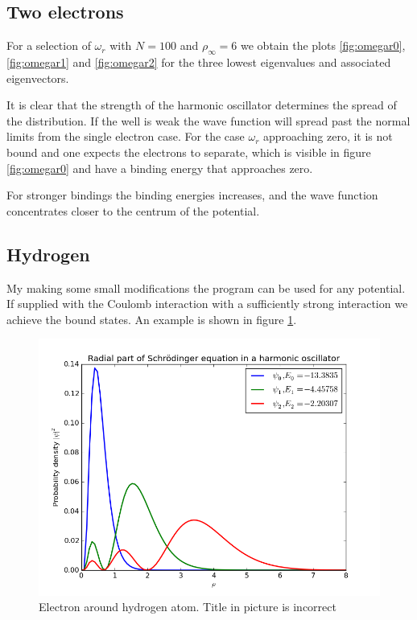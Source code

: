\documentclass[11pt,a4paper,english,final]{article}
\numberwithin{equation}{section}
\newcommand{\figurewidth}{.85\textwidth}
\begin{document}
\subsection{Two electrons}

For a selection of $\omega_r$ with $N = 100$ and $\rho_\infty = 6$ we
obtain the plots \ref{fig:omegar0}, \ref{fig:omegar1} and 
\ref{fig:omegar2} for the three lowest eigenvalues and 
associated eigenvectors.

It is clear that the strength of the harmonic oscillator determines
the spread of the distribution. If the well is weak the wave function
will spread past the normal limits from the single electron case. For the 
case $\omega_r$ approaching zero, it is not bound and one expects 
the electrons to separate, which is visible in figure \ref{fig:omegar0}
and have a binding energy that approaches zero.

For stronger bindings the binding energies increases, and the wave
function concentrates closer to the centrum of the potential.

\subsection{Hydrogen}

My making some small modifications the program can be used for any 
potential. If supplied with the Coulomb interaction with a sufficiently
strong interaction we achieve the bound states. An example is shown in
figure \ref{fig:H}.

\begin{figure}
\centering
\includegraphics[width=\figurewidth]{../results/hydrogen.png}
\caption{Electron around hydrogen atom. Title in picture is incorrect}
\label{fig:H}
\end{figure}
\end{document}

